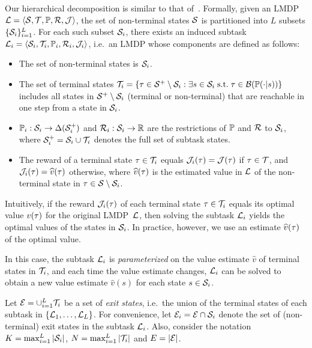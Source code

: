 Our hierarchical decomposition is similar to that of~\citep{Wen2020}. Formally, given an LMDP $\mathcal{L}=\langle\mathcal{S},\mathcal{T},\mathbb{P},\mathcal{R},\mathcal{J}\rangle$, the set of non-terminal states $\mathcal{S}$ is partitioned into $L$ subsets $\{\mathcal{S}_i\}_{i=1}^L$. For each such subset $\mathcal{S}_i$, there exists an induced subtask $\linebreak {\cL_i=\langle\cS_i,\cT_i,\kernel_i,\cR_i,\cJ_i\rangle}$, i.e.~an LMDP whose components are defined as follows:
\begin{itemize}
\item The set of non-terminal states is $\mathcal{S}_i$.
\item The set of terminal states $\mathcal{T}_i=\{\tau \in\mathcal{S}^+\setminus\mathcal{S}_i:\exists s\in \mathcal{S}_i \; \text{s.t.} \; \tau \in \mathcal{B}(\mathbb{P}(\cdot|s))\}$ includes all states in $\mathcal{S}^+\setminus\mathcal{S}_i$ (terminal or non-terminal) that are reachable in one step from a state in $\mathcal{S}_i$.
\item $\mathbb{P}_i:\mathcal{S}_i\rightarrow\Delta(\mathcal{S}_i^+)$ and $\mathcal{R}_i:\mathcal{S}_i\rightarrow\mathbb{R}$ are the restrictions of $\mathbb{P}$ and $\mathcal{R}$ to $\mathcal{S}_i$, where $\mathcal{S}_i^+=\mathcal{S}_i\cup\mathcal{T}_i$ denotes the full set of subtask states.
\item The reward of a terminal state $\tau \in\mathcal{T}_i$ equals $\mathcal{J}_i(\tau)=\mathcal{J}(\tau)$ if $\tau\in\mathcal{T}$, and $\mathcal{J}_i(\tau)=\widehat{v}(\tau)$ otherwise, where $\widehat{v}(\tau)$ is the estimated value in $\mathcal{L}$ of the non-terminal state in  $\tau\in\mathcal{S} \setminus \mathcal{S}_i$.
\end{itemize}

Intuitively, if the reward $\mathcal{J}_i(\tau)$ of each terminal state $\tau\in\mathcal{T}_i$ equals its optimal value $v(\tau)$ for the original LMDP~$\mathcal{L}$, then solving the subtask $\mathcal{L}_i$ yields the optimal values of the states in $\mathcal{S}_i$.
In practice, however, we use an estimate $\widehat{v}(\tau)$ of the optimal value.

In this case, the subtask $\mathcal{L}_i$ is {\em parameterized} on the value estimate $\widehat{v}$ of terminal states in $\mathcal{T}_i$, and each time the value estimate changes, $\mathcal{L}_i$ can be solved to obtain a new value estimate
$\widehat{v}(s)$ for each state $s\in\mathcal{S}_i$.

Let $\mathcal{E}=\cup_{i=1}^L\mathcal{T}_i$ be a set of {\em exit states}, i.e.~the union of the terminal states of each subtask in $\{\mathcal{L}_1,\ldots,\mathcal{L}_L\}$. For convenience, let $\mathcal{E}_i=\mathcal{E}\cap\mathcal{S}_i$ denote the set of (non-terminal) exit states in the subtask $\mathcal{L}_i$. Also, consider the notation $K=\max_{i=1}^L|\mathcal{S}_i|$, $N=\max_{i=1}^L|\mathcal{T}_i|$ and $E=|\mathcal{E}|$.

